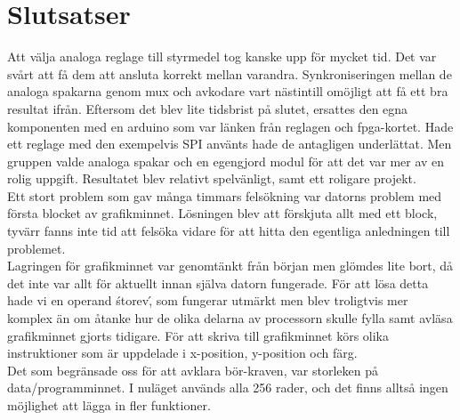 \section{Slutsatser}


Att välja analoga reglage till styrmedel tog kanske upp för mycket tid. Det var svårt att få dem att ansluta korrekt mellan varandra. Synkroniseringen mellan de analoga spakarna genom mux och avkodare vart nästintill omöjligt att få ett bra resultat ifrån. Eftersom det blev lite tidsbrist på slutet, ersattes den egna komponenten med en arduino som var länken från reglagen och fpga-kortet. Hade ett reglage med den exempelvis SPI använts hade de antagligen underlättat. Men gruppen valde analoga spakar och en egengjord modul för att det var mer av en rolig uppgift. Resultatet blev relativt spelvänligt, samt ett roligare projekt.
\\
Ett stort problem som gav många timmars felsökning var datorns problem med första blocket av grafikminnet. Lösningen blev att förskjuta allt med ett block, tyvärr fanns inte tid att felsöka vidare för att hitta den egentliga anledningen till problemet. 
\\
Lagringen för grafikminnet var genomtänkt från början men glömdes lite bort, då det inte var allt för aktuellt innan själva datorn fungerade. För att lösa detta hade vi en operand \'storev\', som fungerar utmärkt men blev troligtvis mer komplex än om åtanke hur de olika delarna av processorn skulle fylla samt avläsa grafikminnet gjorts tidigare. För att skriva till grafikminnet körs olika instruktioner som är uppdelade i x-position, y-position och färg. 
\\
Det som begränsade oss för att avklara bör-kraven, var storleken på data/programminnet. I nuläget används alla 256 rader, och det finns alltså ingen möjlighet att lägga in fler funktioner.
